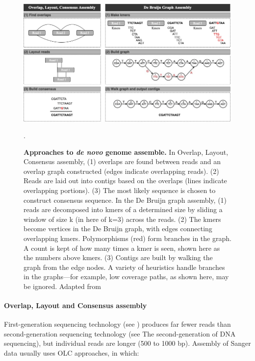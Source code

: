 \begin{figure}[h!]
\centering
\includegraphics[width=\textwidth]{figures/introduction/Figure 8.png}
\caption{\textbf{Approaches to \textit{de novo} genome assemble.} In Overlap, Layout, Consensus assembly, (1) overlaps are found between reads and an overlap graph constructed (edges indicate overlapping reads). (2) Reads are laid out into contigs based on the overlaps (lines indicate overlapping portions). (3) The most likely sequence is chosen to construct consensus sequence. In the De Bruijn graph assembly, (1) reads are decomposed into kmers of a determined size by sliding a window of size k (in here of k=3) across the reads. (2) The kmers become vertices in the De Bruijn graph, with edges connecting overlapping kmers. Polymorphisms (red) form branches in the graph. A count is kept of how many times a kmer is seen, shown here as the numbers above kmers. (3) Contigs are built by walking the graph from the edge nodes. A variety of heuristics handle branches in the graphs—for example, low coverage paths, as shown here, may be ignored. Adapted from \cite{ayling_new_2020}}.
\label{fig:figure8}
\end{figure}

\paragraph{Overlap, Layout and Consensus assembly} \label{sssec:_intro_OLC_assembly} \mbox\\

First-generation sequencing technology (see ) produces far fewer reads than second-generation sequencing technology (see  The second-generation of \ac{DNA} sequencing), but individual reads are longer (500 to 1000 \ac{bp}). 
Assembly of Sanger data usually uses \ac{OLC} approaches, in which:

